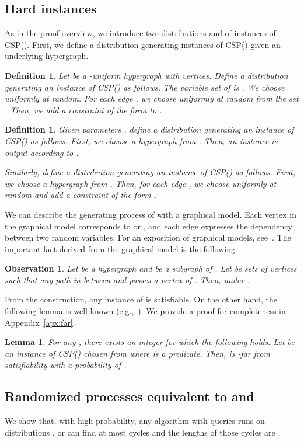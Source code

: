 \documentclass[letterpaper,11pt]{article}
\newtheorem{lemma}[theorem]{Lemma}
\newtheorem{definition}[theorem]{Definition}
\newtheorem{observation}[theorem]{Observation}
\newcommand{\csp}[1]{\textsf{CSP}(#1)\xspace}
\begin{document}
\subsection{Hard instances}\label{subsec:hard-instance}
As in the proof overview, 
we introduce two distributions  and  of instances of \csp{}.
First, we define a distribution generating instances of \csp{} given an underlying hypergraph.
\begin{definition}
  Let  be a -uniform hypergraph with  vertices.
  Define a distribution  generating an instance  of \csp{} as follows.
  The variable set of  is .
  We choose  uniformly at random.
  For each edge , 
  we choose  uniformly at random from the set .
  Then, we add a constraint  of the form  to .
\end{definition}
\begin{definition}
  Given parameters , 
  define a distribution  generating an instance of \csp{} as follows.
  First, we choose a hypergraph  from .
  Then, an instance is output according to .

  Similarly, define a distribution  generating an instance of \csp{} as follows.
  First, we choose a hypergraph  from .
  Then, for each edge ,
  we choose  uniformly at random and add a constraint  of the form .
\end{definition}
We can describe the generating process of  with a graphical model.
Each vertex in the graphical model corresponds to  or ,
and each edge expresses the dependency between two random variables.
For an exposition of graphical models, see~\cite{Bis06}.
The important fact derived from the graphical model is the following.
\begin{observation}
  Let  be a hypergraph and  be a subgraph of .
  Let  be sets of vertices such that any path in  between  and  passes a vertex of .
  Then,  under .
\end{observation}

From the construction, 
any instance of  is satisfiable.
On the other hand, 
the following lemma is well-known (e.g.,~\cite{Sch08,Tul09}).
We provide a proof for completeness in Appendix~\ref{apx:far}.
\begin{lemma}\label{lmm:far}
  For any , there exists an integer  for which the following holds.
  Let  be an instance of \csp{} chosen from  where  is a predicate.
  Then,  is -far from satisfiability with a probability of .
\end{lemma}

\subsection{Randomized processes equivalent to  and }
We show that, with high probability,
any algorithm  with  queries runs on distributions , or  can find at most  cycles and the lengths of those cycles are .
\end{document}
